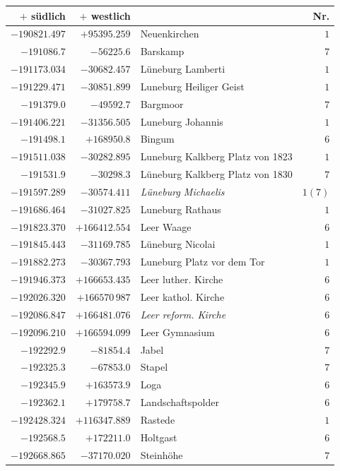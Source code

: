 \clearpage
\begin{center}\begingroup\fontsize{8}{9}\selectfont
\setlength{\tabcolsep}{4pt}
\begin{tabular}{r|r|p{170pt}|r}\hline
\(+\) südlich&\(+\) westlich&&Nr.\\\hline
\(-190821.497\)&\(+95395.259\)&Neuenkirchen&\(1\)\\
\(-191086.7\)&\(-56225.6\)&Barskamp&\(7\)\\
\(-191173.034\)&\(-30682.457\)&Lüneburg Lamberti&\(1\)\\
\(-191229.471\)&\(-30851.899\)&Luneburg Heiliger Geist&\(1\)\\
\(-191379.0\)&\(-49592.7\)&Bargmoor&\(7\)\\
\(-191406.221\)&\(-31356.505\)&Luneburg Johannis&\(1\)\\
\(-191498.1\)&\(+168950.8\)&Bingum&\(6\)\\
\(-191511.038\)&\(-30282.895\)&Luneburg Kalkberg Platz von 1823&\(1\)\\
\(-191531.9\)&\(-30298.3\)&Lüneburg Kalkberg Platz von 1830&\(7\)\\
\(-191597.289\)&\(-30574.411\)&\textit{Lüneburg Michaelis}&\(1 (7)\)\\
\(-191686.464\)&\(-31027.825\)&Luneburg Rathaus&\(1\)\\
\(-191823.370\)&\(+166412.554\)&Leer Waage&\(6\)\\
\(-191845.443\)&\(-31169.785\)&Lüneburg Nicolai&\(1\)\\
\(-191882.273\)&\(-30367.793\)&Luneburg Platz vor dem Tor&\(1\)\\
\(-191946.373\)&\(+166653.435\)&Leer luther. Kirche&\(6\)\\
\(-192026.320\)&\(+166570\,987\)&Leer kathol. Kirche&\(6\)\\
\(-192086.847\)&\(+166481.076\)&\textit{Leer reform. Kirche}&\(6\)\\
\(-192096.210\)&\(+166594.099\)&Leer Gymnasium&\(6\)\\
\(-192292.9\)&\(-81854.4\)&Jabel&\(7\)\\
\(-192325.3\)&\(-67853.0\)&Stapel&\(7\)\\
\(-192345.9\)&\(+163573.9\)&Loga&\(6\)\\
\(-192362.1\)&\(+179758.7\)&Landschaftspolder&\(6\)\\
\(-192428.324\)&\(+116347.889\)&Rastede&\(1\)\\
\(-192568.5\)&\(+172211.0\)&Holtgast&\(6\)\\
\(-192668.865\)&\(-37170.020\)&Steinhöhe&\(7\)\\

\end{tabular}
\end{center}
